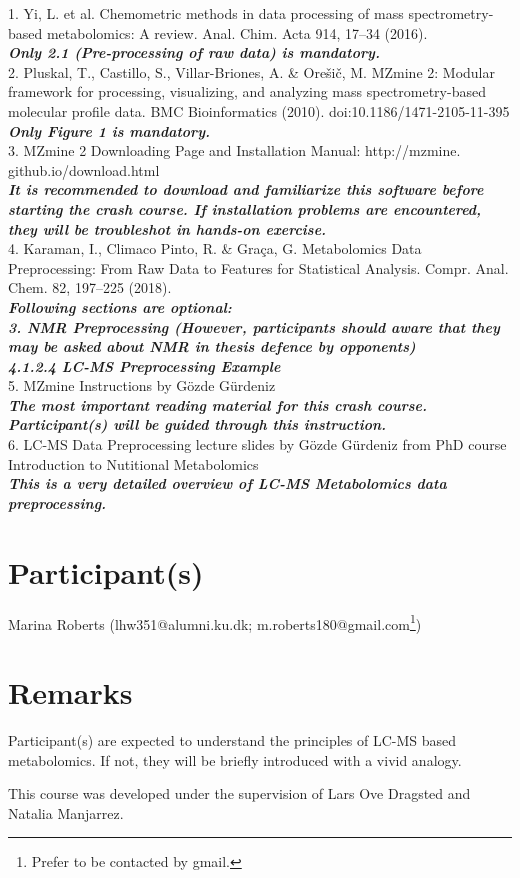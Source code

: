 \documentclass[]{article}
\begin{document}
1. Yi, L. et al. Chemometric methods in data processing of mass spectrometry-based metabolomics: A review. Anal. Chim. Acta 914, 17–34 (2016).\\\textbf{\textit{Only 2.1 (Pre-processing of raw data) is mandatory.}}\\


2. Pluskal, T., Castillo, S., Villar-Briones, A. \& Orešič, M. MZmine 2: Modular framework for processing, visualizing, and analyzing mass spectrometry-based molecular profile data. BMC Bioinformatics (2010). doi:10.1186/1471-2105-11-395 \\\textbf{\textit{Only Figure 1 is mandatory.}}\\

3. MZmine 2 Downloading Page and Installation Manual: http://mzmine.\\github.io/download.html \\\textbf{\textit{It is recommended to download and familiarize this software before starting the crash course. If installation problems are encountered, they will be troubleshot in hands-on exercise.}}\\

4. Karaman, I., Climaco Pinto, R. \& Graça, G. Metabolomics Data Preprocessing: From Raw Data to Features for Statistical Analysis. Compr. Anal. Chem. 82, 197–225 (2018). \\\textbf{\textit{Following sections are optional: \\3. NMR Preprocessing (However, participants should aware that they may be asked about NMR in thesis defence by opponents) \\4.1.2.4 LC-MS Preprocessing Example}}\\

5. MZmine Instructions by Gözde Gürdeniz\\\textbf{\textit{The most important reading material for this crash course. Participant(s) will be guided through this instruction.}}\\

6. LC-MS Data Preprocessing lecture slides by Gözde Gürdeniz from PhD course Introduction to Nutitional Metabolomics\\\textbf{\textit{This is a very detailed overview of LC-MS Metabolomics data preprocessing.}}\\
\section{Participant(s)}
Marina Roberts (lhw351@alumni.ku.dk; m.roberts180@gmail.com\footnote{Prefer to be contacted by gmail.})

\section{Remarks}
Participant(s) are expected to understand the principles of LC-MS based metabolomics. If not, they will be briefly introduced with a vivid analogy.

This course was developed under the supervision of Lars Ove Dragsted and Natalia Manjarrez. 
\end{document}
